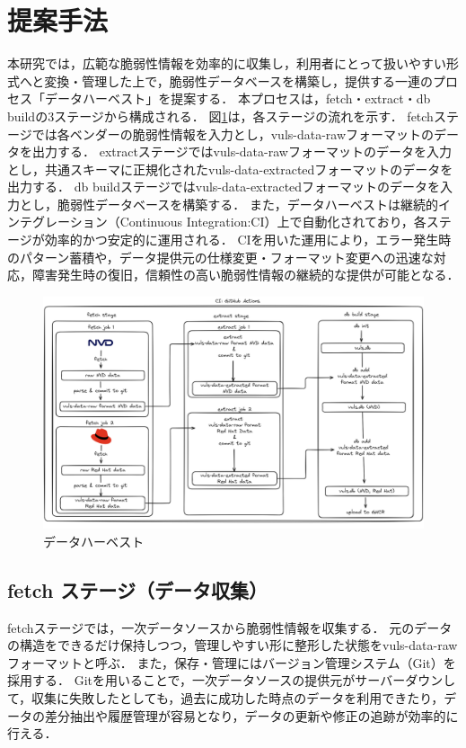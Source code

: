 \section{提案手法}

本研究では，広範な脆弱性情報を効率的に収集し，利用者にとって扱いやすい形式へと変換・管理した上で，脆弱性データベースを構築し，提供する一連のプロセス「データハーベスト」を提案する．
本プロセスは，fetch・extract・db buildの3ステージから構成される．
図\ref{fig:data-harvest}は，各ステージの流れを示す．
fetchステージでは各ベンダーの脆弱性情報を入力とし，vuls-data-rawフォーマットのデータを出力する．
extractステージではvuls-data-rawフォーマットのデータを入力とし，共通スキーマに正規化されたvuls-data-extractedフォーマットのデータを出力する．
db buildステージではvuls-data-extractedフォーマットのデータを入力とし，脆弱性データベースを構築する．
また，データハーベストは継続的インテグレーション（Continuous Integration:CI）上で自動化されており，各ステージが効率的かつ安定的に運用される．
CIを用いた運用により，エラー発生時のパターン蓄積や，データ提供元の仕様変更・フォーマット変更への迅速な対応，障害発生時の復旧，信頼性の高い脆弱性情報の継続的な提供が可能となる．

\begin{figure}[htbp]
  \begin{center}
    \includegraphics[scale=0.25,angle=90]{./2-methods/data-harvest.png}
    \caption{データハーベスト}
    \label{fig:data-harvest}
  \end{center}
\end{figure}


\subsection{fetch ステージ（データ収集）}
fetchステージでは，一次データソースから脆弱性情報を収集する．
元のデータの構造をできるだけ保持しつつ，管理しやすい形に整形した状態をvuls-data-rawフォーマットと呼ぶ．
また，保存・管理にはバージョン管理システム（Git）を採用する．
Gitを用いることで，一次データソースの提供元がサーバーダウンして，収集に失敗したとしても，過去に成功した時点のデータを利用できたり，データの差分抽出や履歴管理が容易となり，データの更新や修正の追跡が効率的に行える．


